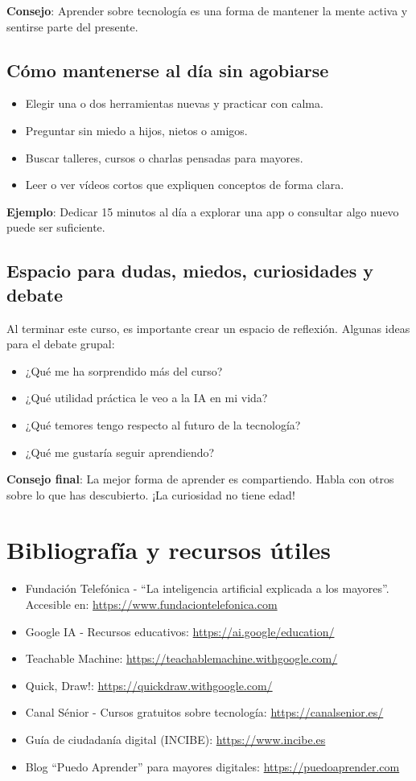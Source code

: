 \documentclass[12pt]{article}
\begin{document}
	\textbf{Consejo}: Aprender sobre tecnología es una forma de mantener la mente activa y sentirse parte del presente.
	
	\subsection*{Cómo mantenerse al día sin agobiarse}
	\begin{itemize}
		\item Elegir una o dos herramientas nuevas y practicar con calma.
		\item Preguntar sin miedo a hijos, nietos o amigos.
		\item Buscar talleres, cursos o charlas pensadas para mayores.
		\item Leer o ver vídeos cortos que expliquen conceptos de forma clara.
	\end{itemize}
	
	\textbf{Ejemplo}: Dedicar 15 minutos al día a explorar una app o consultar algo nuevo puede ser suficiente.
	
	\subsection*{Espacio para dudas, miedos, curiosidades y debate}
	Al terminar este curso, es importante crear un espacio de reflexión. Algunas ideas para el debate grupal:
	\begin{itemize}
		\item ¿Qué me ha sorprendido más del curso?
		\item ¿Qué utilidad práctica le veo a la IA en mi vida?
		\item ¿Qué temores tengo respecto al futuro de la tecnología?
		\item ¿Qué me gustaría seguir aprendiendo?
	\end{itemize}
	
	\textbf{Consejo final}: La mejor forma de aprender es compartiendo. Habla con otros sobre lo que has descubierto. ¡La curiosidad no tiene edad!
	
	\newpage
	\section*{Bibliografía y recursos útiles}
	\begin{itemize}
		\item Fundación Telefónica - “La inteligencia artificial explicada a los mayores”. Accesible en: \url{https://www.fundaciontelefonica.com}
		\item Google IA - Recursos educativos: \url{https://ai.google/education/}
		\item Teachable Machine: \url{https://teachablemachine.withgoogle.com/}
		\item Quick, Draw!: \url{https://quickdraw.withgoogle.com/}
		\item Canal Sénior - Cursos gratuitos sobre tecnología: \url{https://canalsenior.es/}
		\item Guía de ciudadanía digital (INCIBE): \url{https://www.incibe.es}
		\item Blog “Puedo Aprender” para mayores digitales: \url{https://puedoaprender.com}
	\end{itemize}
	
\end{document}
